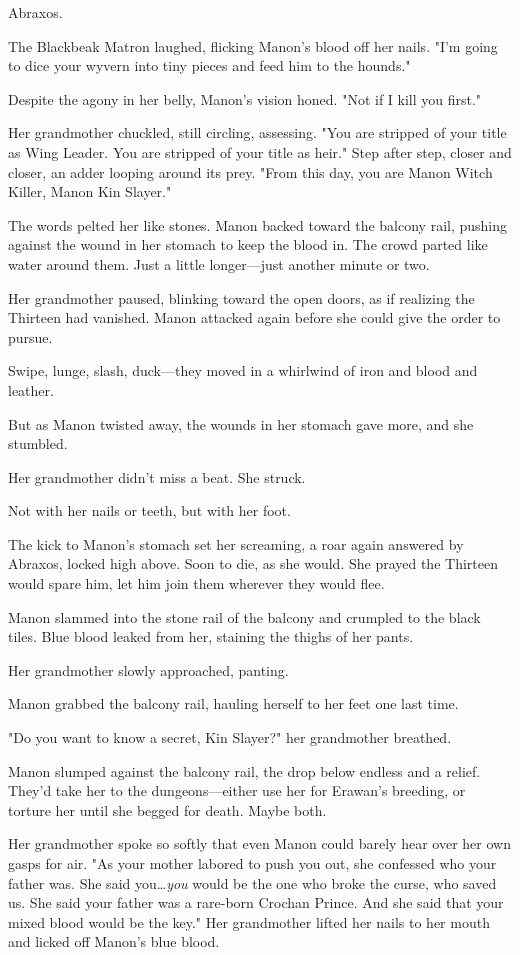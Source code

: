 Abraxos.

The Blackbeak Matron laughed, flicking Manon's blood off her nails.
"I'm going to dice your wyvern into tiny pieces and feed him to the hounds."

Despite the agony in her belly, Manon's vision honed.
"Not if I kill you first."

Her grandmother chuckled, still circling, assessing.
"You are stripped of your title as Wing Leader.
You are stripped of your title as heir."
Step after step, closer and closer, an adder looping around its prey.
"From this day, you are Manon Witch Killer, Manon Kin Slayer."

The words pelted her like stones.
Manon backed toward the balcony rail, pushing against the wound in her stomach to keep the blood in.
The crowd parted like water around them.
Just a little longer---just another minute or two.

Her grandmother paused, blinking toward the open doors, as if realizing the Thirteen had vanished.
Manon attacked again before she could give the order to pursue.

Swipe, lunge, slash, duck---they moved in a whirlwind of iron and blood and leather.

But as Manon twisted away, the wounds in her stomach gave more, and she stumbled.

Her grandmother didn't miss a beat.
She struck.

Not with her nails or teeth, but with her foot.

The kick to Manon's stomach set her screaming, a roar again answered by Abraxos, locked high above.
Soon to die, as she would.
She prayed the Thirteen would spare him, let him join them wherever they would flee.

Manon slammed into the stone rail of the balcony and crumpled to the black tiles.
Blue blood leaked from her, staining the thighs of her pants.

Her grandmother slowly approached, panting.

Manon grabbed the balcony rail, hauling herself to her feet one last time.

"Do you want to know a secret, Kin Slayer?"
her grandmother breathed.

Manon slumped against the balcony rail, the drop below endless and a relief.
They'd take her to the dungeons---either use her for Erawan's breeding, or torture her until she begged for death.
Maybe both.

Her grandmother spoke so softly that even Manon could barely hear over her own gasps for air.
"As your mother labored to push you out, she confessed who your father was.
She said you\ldots \emph{you} would be the one who broke the curse, who saved us.
She said your father was a rare-born Crochan Prince.
And she said that your mixed blood would be the key."
Her grandmother lifted her nails to her mouth and licked off Manon's blue blood.

